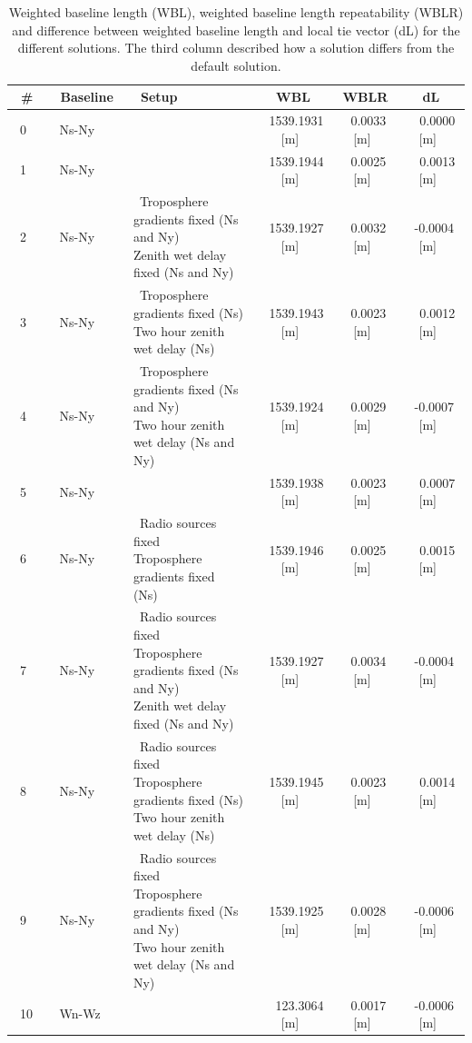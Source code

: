 \documentclass[natbib,twocolumn,twoside]{svmultiag}
\begin{document}
\begin{table}[t]
	\begin{tabularx}{\textwidth}{l|l|X|c|c|c}
	~\#~ & ~Baseline~ & ~Setup~ & WBL & WBLR & dL \\
	\hline
	~0~ & ~Ns-Ny~ & ~\makecell[tl]{Default}~ & ~1539.1931 [m]~ & ~0.0033 [m]~ & ~~0.0000 [m]~ \\
	~1~ & ~Ns-Ny~ & ~\makecell[tl]{Troposphere gradients fixed (Ns)}~ & ~1539.1944 [m]~ & ~0.0025 [m]~ & ~~0.0013 [m]~ \\ 
	~2~ & ~Ns-Ny~ & ~\makecell[tl]{Troposphere gradients fixed (Ns and Ny) \\ 
	Zenith wet delay fixed (Ns and Ny)}~ & ~1539.1927 [m]~ & ~0.0032 [m]~ & ~-0.0004 [m]~ \\ 
	~3~ & ~Ns-Ny~ & ~\makecell[tl]{Troposphere gradients fixed (Ns) \\ 
	Two hour zenith wet delay (Ns)}~ & ~1539.1943 [m]~ & ~0.0023 [m]~  & ~~0.0012 [m]~ \\
	~4~ & ~Ns-Ny~ & ~\makecell[tl]{Troposphere gradients fixed (Ns and Ny) \\ 
	Two hour zenith wet delay (Ns and Ny)}~ & ~1539.1924 [m]~ & ~0.0029 [m]~ & ~-0.0007 [m]~ \\
	~5~ & ~Ns-Ny~ & ~\makecell[tl]{Radio sources fixed}~ & ~1539.1938 [m]~ & ~0.0023 [m]~ & ~~0.0007 [m]~ \\
	~6~ & ~Ns-Ny~ & ~\makecell[tl]{Radio sources fixed \\ 
	Troposphere gradients fixed (Ns)}~ & ~1539.1946 [m]~ & ~0.0025 [m]~ & ~~0.0015 [m]~ \\
	~7~ & ~Ns-Ny~ & ~\makecell[tl]{Radio sources fixed \\ 
	Troposphere gradients fixed (Ns and Ny) \\ 
	Zenith wet delay fixed (Ns and Ny)}~  & ~1539.1927 [m]~ & ~0.0034 [m]~ & ~-0.0004 [m]~ \\
	~8~ & ~Ns-Ny~ & ~\makecell[tl]{Radio sources fixed \\ 
	Troposphere gradients fixed (Ns) \\ 
	Two hour zenith wet delay (Ns)}~ & ~1539.1945 [m]~ & ~0.0023 [m]~ & ~~0.0014 [m]~ \\
	~9~ & ~Ns-Ny~ & ~\makecell[tl]{Radio sources fixed \\ 
	Troposphere gradients fixed (Ns and Ny) \\ 
	Two hour zenith wet delay (Ns and Ny)}~ & ~1539.1925 [m]~ & ~0.0028 [m]~ & ~-0.0006 [m]~ \\
	~10~ & ~Wn-Wz~ & ~\makecell[tl]{Default}~ & ~~123.3064 [m]~ & ~0.0017 [m]~ & ~-0.0006 [m]~ \\
	\hline
	\end{tabularx}
\caption{{Weighted baseline length (WBL), weighted baseline length repeatability (WBLR) and difference 
between weighted baseline length and local tie vector (dL) for the different solutions. The third column described how 
a solution differs from the default solution.
}}
\label{tab:solutions}
\end{table}
\end{document}
